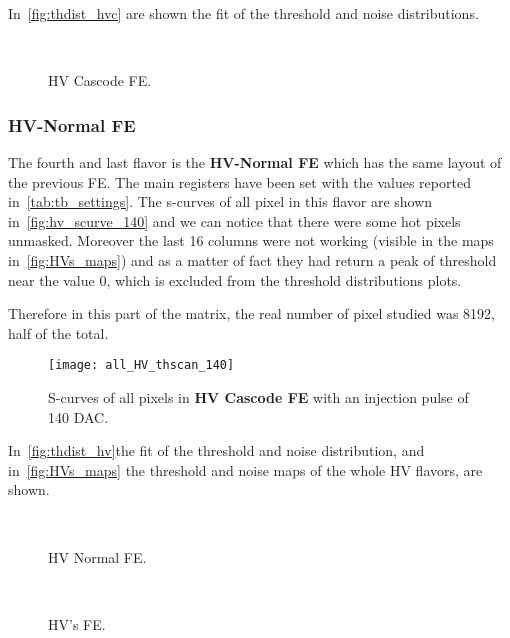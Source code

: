 In~\autoref{fig:thdist_hvc} are shown the fit of the threshold and noise distributions.

\begin{figure}[h!]
\centering
{}\quad
{}\\
\caption{HV Cascode FE.}
\label{fig:thdist_hvc}
\end{figure}


\subsubsection{HV-Normal FE}\label{sec:first_xtalk}

The fourth and last flavor is the \textbf{HV-Normal FE} which has the same layout of the previous FE. The main registers have been set with the values reported in~\autoref{tab:tb_settings}.
The s-curves of all pixel in this flavor are shown in~\autoref{fig:hv_scurve_140} and we can notice that there were some hot pixels unmasked.
Moreover the last 16 columns were not working (visible in the maps in~\autoref{fig:HVs_maps}) and as a matter of fact they had return a peak of threshold near the value 0, which is excluded from the threshold distributions plots.

Therefore in this part of the matrix, the real number of pixel studied was 8192, half of the total.


\begin{figure}[h!]
\centering
\texttt{[image: all\_HV\_thscan\_140]}
\caption{S-curves of all pixels in \textbf{HV Cascode FE} with an injection pulse of 140 DAC.}
\label{fig:hv_scurve_140}
\end{figure}

In~\autoref{fig:thdist_hv}the fit of the threshold and noise distribution, and in~\autoref{fig:HVs_maps} the threshold and noise maps of the whole HV flavors, are shown. 

\begin{figure}[h!]
\centering
{}\quad
{}\\
\caption{HV Normal FE.}
\label{fig:thdist_hv}
\end{figure}


\begin{figure}[h!]
\centering
{}\quad
{}\\
\caption{HV's FE.}
\label{fig:HVs_maps}
\end{figure}

